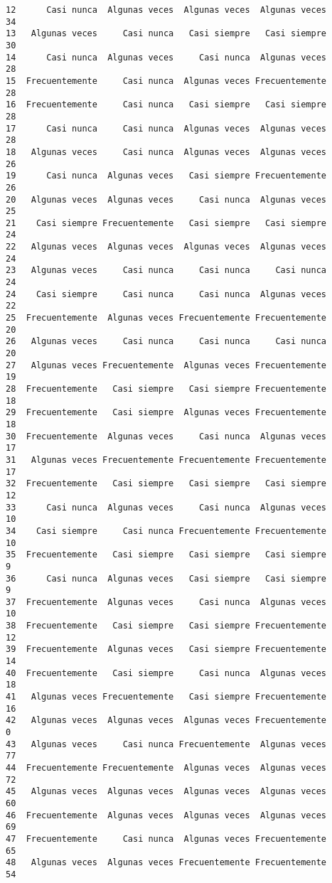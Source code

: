 \documentclass[
  letterpaper,
  DIV=11,
  numbers=noendperiod]{scrartcl}
\begin{document}
\begin{verbatim}
12      Casi nunca  Algunas veces  Algunas veces  Algunas veces      34
13   Algunas veces     Casi nunca   Casi siempre   Casi siempre      30
14      Casi nunca  Algunas veces     Casi nunca  Algunas veces      28
15  Frecuentemente     Casi nunca  Algunas veces Frecuentemente      28
16  Frecuentemente     Casi nunca   Casi siempre   Casi siempre      28
17      Casi nunca     Casi nunca  Algunas veces  Algunas veces      28
18   Algunas veces     Casi nunca  Algunas veces  Algunas veces      26
19      Casi nunca  Algunas veces   Casi siempre Frecuentemente      26
20   Algunas veces  Algunas veces     Casi nunca  Algunas veces      25
21    Casi siempre Frecuentemente   Casi siempre   Casi siempre      24
22   Algunas veces  Algunas veces  Algunas veces  Algunas veces      24
23   Algunas veces     Casi nunca     Casi nunca     Casi nunca      24
24    Casi siempre     Casi nunca     Casi nunca  Algunas veces      22
25  Frecuentemente  Algunas veces Frecuentemente Frecuentemente      20
26   Algunas veces     Casi nunca     Casi nunca     Casi nunca      20
27   Algunas veces Frecuentemente  Algunas veces Frecuentemente      19
28  Frecuentemente   Casi siempre   Casi siempre Frecuentemente      18
29  Frecuentemente   Casi siempre  Algunas veces Frecuentemente      18
30  Frecuentemente  Algunas veces     Casi nunca  Algunas veces      17
31   Algunas veces Frecuentemente Frecuentemente Frecuentemente      17
32  Frecuentemente   Casi siempre   Casi siempre   Casi siempre      12
33      Casi nunca  Algunas veces     Casi nunca  Algunas veces      10
34    Casi siempre     Casi nunca Frecuentemente Frecuentemente      10
35  Frecuentemente   Casi siempre   Casi siempre   Casi siempre       9
36      Casi nunca  Algunas veces   Casi siempre   Casi siempre       9
37  Frecuentemente  Algunas veces     Casi nunca  Algunas veces      10
38  Frecuentemente   Casi siempre   Casi siempre Frecuentemente      12
39  Frecuentemente  Algunas veces   Casi siempre Frecuentemente      14
40  Frecuentemente   Casi siempre     Casi nunca  Algunas veces      18
41   Algunas veces Frecuentemente   Casi siempre Frecuentemente      16
42   Algunas veces  Algunas veces  Algunas veces Frecuentemente       0
43   Algunas veces     Casi nunca Frecuentemente  Algunas veces      77
44  Frecuentemente Frecuentemente  Algunas veces  Algunas veces      72
45   Algunas veces  Algunas veces  Algunas veces  Algunas veces      60
46  Frecuentemente  Algunas veces  Algunas veces  Algunas veces      69
47  Frecuentemente     Casi nunca  Algunas veces Frecuentemente      65
48   Algunas veces  Algunas veces Frecuentemente Frecuentemente      54

\end{verbatim}
\end{document}

